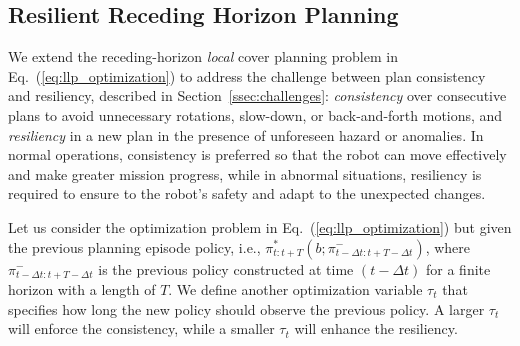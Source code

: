 \documentclass[letterpaper]{article} %
\newcommand{\phdone}[1]{} %
\newcommand{\argmax}{\mathop{\mathrm{argmax}}}
\begin{document}
\subsection{Resilient Receding Horizon Planning} \label{ssec:resilient_rhp}
%

\phdone{Consistency and Resiliency}
We extend the receding-horizon \textit{local} cover planning problem
in Eq.~(\ref{eq:llp_optimization}) to address the challenge between plan consistency and resiliency, described in Section~\ref{ssec:challenges}:
\textit{consistency} over consecutive plans to avoid unnecessary rotations, slow-down, or back-and-forth motions,
and \textit{resiliency} in a new plan in the presence of unforeseen hazard or anomalies.
In normal operations, consistency is preferred so that the robot can move effectively and make greater mission progress, while in abnormal situations, resiliency is required to ensure to the robot's safety and adapt to the unexpected changes.


\phdone{Receding Horizon Planning Re-formulation}
Let us consider the optimization problem in Eq.~(\ref{eq:llp_optimization}) but given the previous planning episode policy, i.e., 
$\pi_{t:t+T}^*(b; \pi_{t-\Delta t:t+T-\Delta t}^-)$, where $\pi_{t-\Delta t:t+T-\Delta t}^-$ is the previous policy constructed at time $(t - \Delta t)$ for a finite horizon with a length of $T$.
%
%
We define another optimization variable $\tau_t$ that specifies how long the new policy should observe the previous policy.
A larger $\tau_t$ will enforce the consistency, while a smaller $\tau_t$ will enhance the resiliency.
\end{document}
